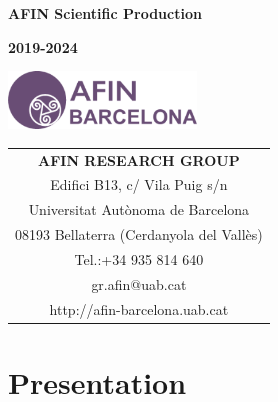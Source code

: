 \documentclass[english,a4paper,12pt,titlepage]{report}
\begin{document}
	\begin{titlepage}
		\centering

	\hspace{0pt}	
	\vspace*{\fill}

	    \Huge\textcolor{afin}{\bf AFIN Scientific Production}
	    \vspace{2cm}
	    
	    \large{\bf 2019-2024}
	    
	    \vspace{2cm}
	    
	    \includegraphics[width=5cm]{AFIN-Barcelona.png}

	    \vspace{3cm}

		\begin{tabular}{c}
			\textcolor{afin}{\bf AFIN RESEARCH GROUP} \\
			Edifici B13, c/ Vila Puig s/n \\
			Universitat Autònoma de Barcelona \\
			08193 Bellaterra (Cerdanyola del Vallès) \\
			Tel.:+34 935 814 640 \\
			gr.afin@uab.cat \\
			http://afin-barcelona.uab.cat
		\end{tabular}
	
	\vspace{\fill}
	
		\end{titlepage}
		
\tableofcontents

	\chapter{Presentation}
\end{document}

